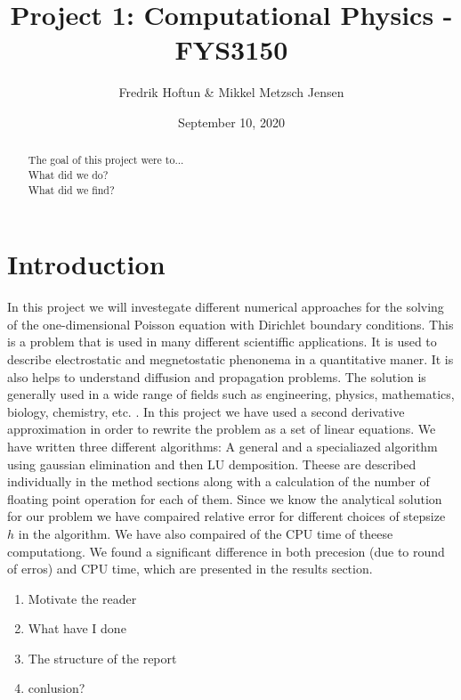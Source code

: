 \documentclass[american,a4paper,12pt]{article}
\title{Project 1: Computational Physics - FYS3150}
\author{Fredrik Hoftun \& Mikkel Metzsch Jensen}
\date{September 10, 2020}
\begin{document}
\maketitle

\tableofcontents


\begin{abstract}
  The goal of this project were to... \\
  What did we do? \\
  What did we find? \\
\end{abstract}

\section{Introduction}
  In this project we will investegate different numerical approaches for the solving of the one-dimensional Poisson equation with Dirichlet boundary conditions. This is a problem that is used in many different scientiffic applications. It is used to describe electrostatic and megnetostatic phenonema in a quantitative maner. It is also helps to understand diffusion and propagation problems. The solution is generally used in a wide range of fields such as engineering, physics, mathematics, biology, chemistry, etc. \cite{poisson_paper}. In this project we have used a second derivative approximation in order to rewrite the problem as a set of linear equations. We have written three different algorithms: A general and a specialiazed algorithm using gaussian elimination and then LU demposition. Theese are described individually in the method sections along with a calculation of the number of floating point operation for each of them. Since we know the analytical solution for our problem we have compaired relative error for different choices of stepsize $h$ in the algorithm. We have also compaired of the CPU time of theese computationg. We found a significant difference in both precesion (due to round of erros) and CPU time, which are presented in the results section.

  \begin{enumerate}
    \item Motivate the reader
    \item What have I done
    \item The structure of the report
    \item conlusion?
  \end{enumerate}
\end{document}
